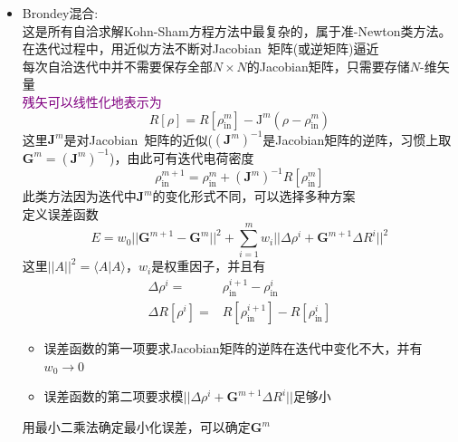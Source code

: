{\begin{itemize}
	\begin{displaymath}
		a_i=\dfrac{\sum\limits_{j}A_{j,i}^{-1}}{\sum\limits_{j,k}A_{j,k}^{-1}}\qquad A_{j,k}=\langle R[\rho_{\mathrm{in}}^{j}]|R[\rho_{\mathrm{in}}^{k}]\rangle 
	\end{displaymath}
\item \textrm{Brondey}混合:\\
	这是所有自洽求解\textrm{Kohn-Sham}方程方法中最复杂的，属于准-\textrm{Newton}类方法。在迭代过程中，用近似方法不断对\textrm{Jacobian~}矩阵(或逆矩阵)逼近\\
	每次自洽迭代中并不需要保存全部$N\times N$的\textrm{Jacobian}矩阵，只需要存储$N$-维矢量\\
	\textcolor{purple}{残矢可以线性化地表示为}
	\begin{displaymath}
		R[\rho]=R[\rho_{\mathrm{in}}^m]-\mathrm{J}^m(\rho-\rho_{\mathrm{in}}^m)
	\end{displaymath}
	这里$\mathbf{J}^m$是对\textrm{Jacobian~}矩阵的近似($(\mathbf{J}^m)^{-1}$是\textrm{Jacobian}矩阵的逆阵，习惯上取$\mathbf{G}^m=(\mathbf{J}^m)^{-1}$)，由此可有迭代电荷密度
	\begin{displaymath}
		\rho_{\mathrm{in}}^{m+1}=\rho_{\mathrm{in}}^m+(\mathbf{J}^m)^{-1}R[\rho_{\mathrm{in}}^m]
	\end{displaymath}
	此类方法因为迭代中$\mathbf{J}^m$的变化形式不同，可以选择多种方案\\
	定义误差函数
	\begin{displaymath}
		E=w_0||\mathbf{G}^{m+1}-\mathbf{G}^m||^2+\sum_{i=1}^mw_i||\Delta\rho^i+\mathbf{G}^{m+1}\Delta R^i||^2
	\end{displaymath}
	这里$||A||^2=\langle A|A\rangle$，$w_i$是权重因子，并且有
	\begin{displaymath}
		\begin{aligned}
			\Delta\rho^i=&\rho_{\mathrm{in}}^{i+1}-\rho_{\mathrm{in}}^{i}\\
			\Delta R[\rho^i]=&R[\rho_{\mathrm{in}}^{i+1}]-R[\rho_{\mathrm{in}}^{i}]
		\end{aligned}
	\end{displaymath}
	\begin{itemize}
		\item 误差函数的第一项要求\textrm{Jacobian}矩阵的逆阵在迭代中变化不大，并有$w_0\rightarrow0$
		\item 误差函数的第二项要求模$||\Delta\rho^i+\mathbf{G}^{m+1}\Delta R^i||$足够小
	\end{itemize}
	用最小二乘法确定最小化误差，可以确定$\mathbf{G}^m$
	\begin{displaymath}

\end{displaymath}
\end{itemize}}
